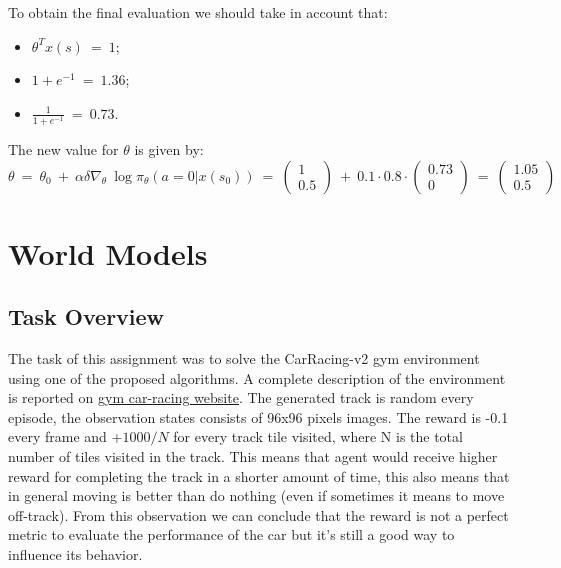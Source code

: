 \documentclass[10pt,a4paper]{article}
\begin{document}
\noindent To obtain the final evaluation we should take in account that:
\begin{itemize}
    \item $\theta^{T} x(s) \:=\: 1$;
    \item $1+e^{-1} \:=\: 1.36$;
    \item $\frac{1}{1+e^{-1}} \:=\: 0.73$.
\end{itemize}
The new value for $\theta$ is given by:
\begin{equation*}
    \theta \:=\: \theta_0 \:+\: \alpha \delta \nabla_{\theta} \:\log \pi_{\theta} (a=0 | x(s_0))
    \:=\: \begin{pmatrix} 1 \\ 0.5 \end{pmatrix} \:+\: 0.1 \cdot 0.8 \cdot \begin{pmatrix} 0.73 \\ 0 \end{pmatrix} \:=\: \begin{pmatrix} 1.05 \\ 0.5 \end{pmatrix} 
\end{equation*}
\newpage 

\section{World Models}
 
\subsection{Task Overview}
The task of this assignment was to solve the CarRacing-v2 gym environment using one of the proposed algorithms. A complete description of the environment is reported on \href{https://www.gymlibrary.dev/environments/box2d/car_racing/}{\underline{gym  car-racing website}}. The generated track is random every episode, the observation states consists of 96x96 pixels images. The reward is -0.1 every frame and +$1000/N$ for every track tile visited, where N is the total number of tiles visited in the track. This means that agent would receive higher reward for completing the track in a shorter amount of time, this also means that in general moving is better than do nothing (even if sometimes it means to move off-track). From this observation we can conclude that the reward is not a perfect metric to evaluate the performance of the car but it's still a good way to influence its behavior. 
\end{document}
